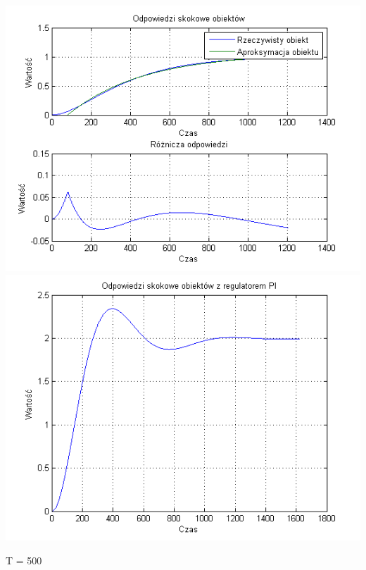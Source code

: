\documentclass[10pt,a4paper]{article}
\begin{document}
\begin{center}
\includegraphics[scale=1]{images/jeden/skrypt_81.png}\\
\includegraphics[scale=1]{images/jeden/skrypt_82.png}\\
\end{center}
\newpage
T = 500
\end{document}
